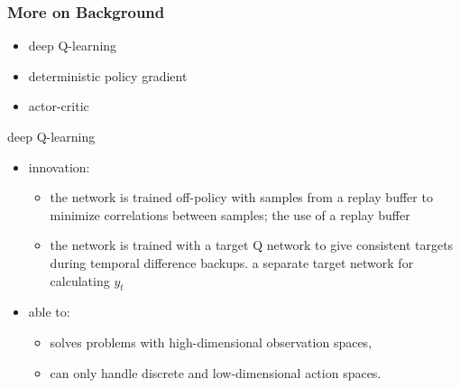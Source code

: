 \begin{frame}
\frametitle{More on Background}

\begin{itemize}
  \item deep Q-learning \cite{Mnih2013}
  \item deterministic policy gradient \cite{Silver2014}
  \item actor-critic
\end{itemize}

deep Q-learning \cite{Mnih2013}
\begin{itemize}
  \item innovation:
  \begin{itemize}
    \item the network is trained off-policy with samples from a replay buffer to minimize correlations between samples;
    the use of a replay buffer
    \item the network is trained with a target Q network to give consistent targets during temporal difference backups.
    a separate target network for calculating $y_t$
  \end{itemize}
  \item able to:
  \begin{itemize}
    \item solves problems with high-dimensional observation spaces,
    \item can only handle discrete and low-dimensional action spaces.
  \end{itemize}
\end{itemize}

\end{frame}
